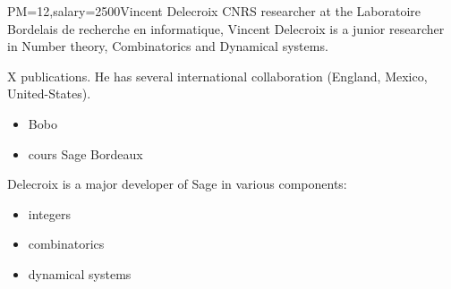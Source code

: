 \begin{participant}{PM=12,salary=2500}{Vincent Delecroix}
  CNRS researcher at the Laboratoire Bordelais de recherche en informatique, Vincent
  Delecroix is a junior researcher in Number theory, Combinatorics and Dynamical systems.

  X publications.  He has several international collaboration (England, Mexico,
  United-States).

  \begin{itemize}
\item  Bobo
\item  cours Sage Bordeaux
\end{itemize}

Delecroix is a major developer of Sage in various components:
\begin{itemize}
\item  integers
\item  combinatorics
\item dynamical systems
\end{itemize}
\end{participant}

